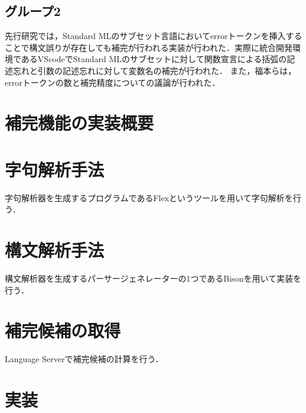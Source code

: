 \documentclass[12pt,a4j]{jreport}
\begin{document}
\section{グループ2}
先行研究\cite{sato}では，Standard MLのサブセット言語においてerrorトークンを挿入することで構文誤りが存在しても補完が行われる実装が行われた．実際に統合開発環境であるVScodeでStandard MLのサブセットに対して関数宣言による括弧の記述忘れと引数の記述忘れに対して変数名の補完が行われた．
また，福本ら\cite{fjei}は，errorトークンの数と補完精度についての議論が行われた．


\chapter{補完機能の実装概要}





\chapter{字句解析手法}
字句解析器を生成するプログラムであるFlex\cite{flex}というツールを用いて字句解析を行う．





\chapter{構文解析手法}
構文解析器を生成するパーサージェネレーターの1つであるBison\cite{bison}を用いて実装を行う．





\chapter{補完候補の取得}
Language Serverで補完候補の計算を行う\cite{lsp}．



\chapter{実装}
\end{document}
